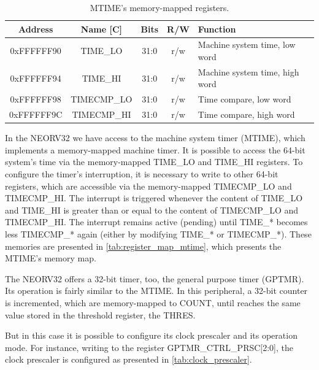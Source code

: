         \begin{table}[!ht]
        	\centering
        	\caption{MTIME's memory-mapped registers.}
        	\begin{tabular}{ccccp{4cm}}
        		\toprule
        		\textbf{Address} & \textbf{Name [C]} & \textbf{Bits} & \textbf{R/W} & \textbf{Function} \\
        		\midrule
        		\midrule
        		0xFFFFFF90 & TIME\_LO & 31:0 & r/w & Machine system time, low word \\
        		0xFFFFFF94 & TIME\_HI & 31:0 & r/w & Machine system time, high word \\
        		0xFFFFFF98 & TIMECMP\_LO & 31:0 & r/w & Time compare, low word \\
        		0xFFFFFF9C & TIMECMP\_HI & 31:0 & r/w & Time compare, high word \\
        		\bottomrule
        	\end{tabular}
        	\label{tab:register_map_mtime}
        \end{table}

        In the NEORV32 we have access to the machine system timer (MTIME), which implements a memory-mapped machine timer. It is possible to access the 64-bit system's time via the memory-mapped TIME\_LO and TIME\_HI registers. To configure the timer's interruption, it is necessary to write to other 64-bit registers, which are accessible via the memory-mapped TIMECMP\_LO and TIMECMP\_HI. The interrupt is triggered whenever the content of TIME\_LO and TIME\_HI is greater than or equal to the content of TIMECMP\_LO and TIMECMP\_HI. The interrupt remains active (pending) until TIME\_* becomes less TIMECMP\_* again (either by modifying TIME\_* or TIMECMP\_*). These memories are presented in \autoref{tab:register_map_mtime}, which presents the MTIME's memory map.

        The NEORV32 offers a 32-bit timer, too, the general purpose timer (GPTMR). Its operation is fairly similar to the MTIME. In this peripheral, a 32-bit counter is incremented, which are memory-mapped to COUNT, until reaches the same value stored in the threshold register, the THRES. 

        But in this case it is possible to configure its clock prescaler and its operation mode. For instance, writing to the register GPTMR\_CTRL\_PRSC[2:0], the clock prescaler is configured as presented in \autoref{tab:clock_prescaler}.

